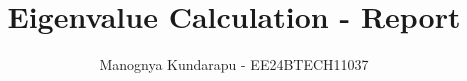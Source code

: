 \documentclass[journal]{IEEEtran}
\begin{document}

\vspace{3cm}

\title{Eigenvalue Calculation - Report}
\author{Manognya Kundarapu - EE24BTECH11037
}
{\let\newpage\relax\maketitle}

\renewcommand{\thefigure}{\theenumi}
\renewcommand{\thetable}{\theenumi}
\setlength{\intextsep}{10pt} %


\renewcommand{\thetable}{\theenumi}
\end{document}
